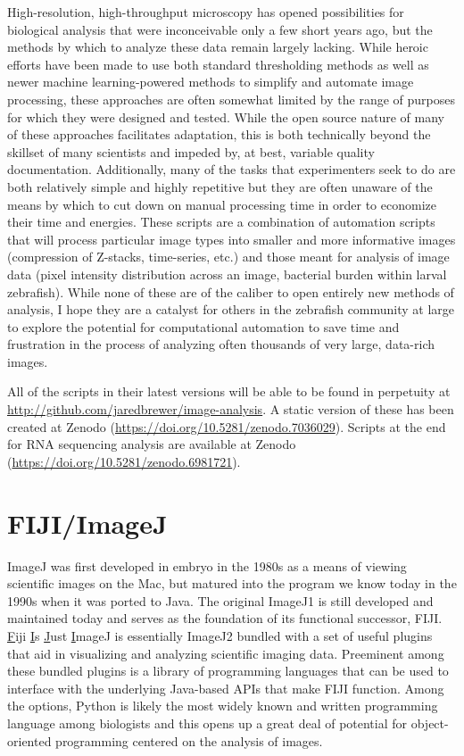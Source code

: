 High-resolution, high-throughput microscopy has opened possibilities for biological analysis that were inconceivable only a few short years ago, but the methods by which to analyze these data remain largely lacking. While heroic efforts have been made to use both standard thresholding methods as well as newer machine learning-powered methods to simplify and automate image processing, these approaches are often somewhat limited by the range of purposes for which they were designed and tested. While the open source nature of many of these approaches facilitates adaptation, this is both technically beyond the skillset of many scientists and impeded by, at best, variable quality documentation. Additionally, many of the tasks that experimenters seek to do are both relatively simple and highly repetitive but they are often unaware of the means by which to cut down on manual processing time in order to economize their time and energies. These scripts are a combination of automation scripts that will process particular image types into smaller and more informative images (compression of Z-stacks, time-series, etc.) and those meant for analysis of image data (pixel intensity distribution across an image, bacterial burden within larval zebrafish). While none of these are of the caliber to open entirely new methods of analysis, I hope they are a catalyst for others in the zebrafish community at large to explore the potential for computational automation to save time and frustration in the process of analyzing often thousands of very large, data-rich images.

All of the scripts in their latest versions will be able to be found in perpetuity at \url{http://github.com/jaredbrewer/image-analysis}. A static version of these has been created at Zenodo (\url{https://doi.org/10.5281/zenodo.7036029}). Scripts at the end for RNA sequencing analysis are available at Zenodo (\url{https://doi.org/10.5281/zenodo.6981721}). 

\section{FIJI/ImageJ}\label{fiji}

ImageJ was first developed in embryo in the 1980s as a means of viewing scientific images on the Mac, but matured into the program we know today in the 1990s when it was ported to Java. The original ImageJ1 is still developed and maintained today and serves as the foundation of its functional successor, FIJI. \underline{F}iji \underline{I}s \underline{J}ust \underline{I}mageJ is essentially ImageJ2 bundled with a set of useful plugins that aid in visualizing and analyzing scientific imaging data. Preeminent among these bundled plugins is a library of programming languages that can be used to interface with the underlying Java-based APIs that make FIJI function. Among the options, Python is likely the most widely known and written programming language among biologists and this opens up a great deal of potential for object-oriented programming centered on the analysis of images. 

